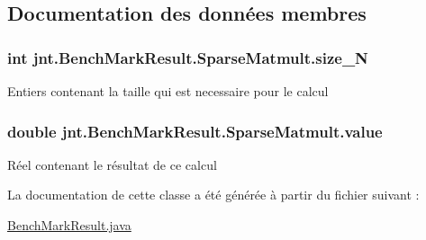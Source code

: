 \subsection{Documentation des données membres}
\hypertarget{classjnt_1_1BenchMarkResult_1_1SparseMatmult_a10bd94e346f3cf77c5a84fec1aa4a7d9}{
\subsubsection[{size\-\_\-\-N}]{\setlength{\rightskip}{0pt plus 5cm}int jnt.\-Bench\-Mark\-Result.\-Sparse\-Matmult.\-size\-\_\-\-N}}\label{classjnt_1_1BenchMarkResult_1_1SparseMatmult_a10bd94e346f3cf77c5a84fec1aa4a7d9}
Entiers contenant la taille qui est necessaire pour le calcul \hypertarget{classjnt_1_1BenchMarkResult_1_1SparseMatmult_aa59accc2a3a250fcfbea547a16633082}{
\subsubsection[{value}]{\setlength{\rightskip}{0pt plus 5cm}double jnt.\-Bench\-Mark\-Result.\-Sparse\-Matmult.\-value}}\label{classjnt_1_1BenchMarkResult_1_1SparseMatmult_aa59accc2a3a250fcfbea547a16633082}
Réel contenant le résultat de ce calcul 

La documentation de cette classe a été générée à partir du fichier suivant \-:\begin{DoxyCompactItemize}
\item 
\hyperlink{BenchMarkResult_8java}{Bench\-Mark\-Result.\-java}\end{DoxyCompactItemize}
